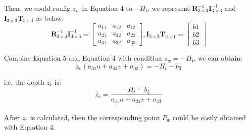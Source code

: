 \documentclass[
	letterpaper, %
	10pt, %
]{CSUniSchoolLabReport}
\begin{document}
Then, we could config $z_w$ in Equation 4 to $-H_t$, we represent $\bm{R}^{-1}_{3\times 3}\bm{I}^{-1}_{3\times 3}$ and $\bm{I}_{3\times 3}\bm{T}_{3\times 1}$ as below:
\begin{equation}
\bm{R}^{-1}_{3\times 3}\bm{I}^{-1}_{3\times 3} = \begin{bmatrix}
a_{11} & a_{12} & a_{13} \\
a_{21} & a_{22} & a_{23} \\
a_{31} & a_{32} & a_{33} 
\end{bmatrix}, \bm{I}_{3\times 3}\bm{T}_{3\times 1} = \begin{bmatrix}
b1 \\
b2 \\
b3
\end{bmatrix}
\end{equation}

Combine Equation 5 and Equation 4 with condition $z_w = -H_t$, we can obtain:
\begin{equation}
z_c(a_{31}u + a_{32}v + a_{33}) = -H_t - b_3
\end{equation} 

i.e, the depth $z_c$ is:
\begin{equation}
z_c = \frac{-H_t - b_3}{a_{31}u + a_{32}v + a_{33}}
\end{equation} \\

After $z_c$ is calculated, then the corresponding point $P_w$ could be easily obtained with Equation 4.




\printbibliography %

\end{document}
